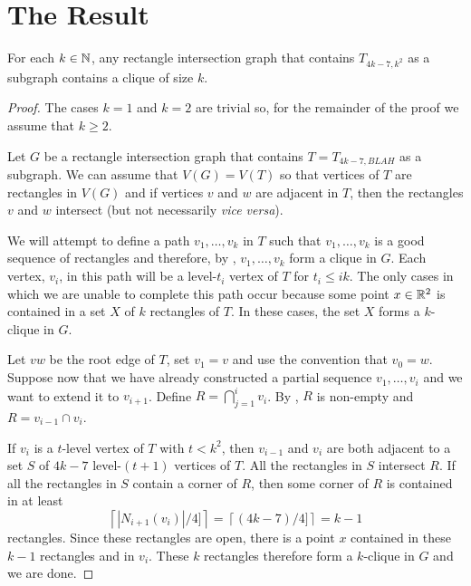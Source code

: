 \documentclass[lotsofwhite]{patmorin}
\begin{document}
\section{The Result}

\begin{thm}
  For each $k\in \mathbb{N}$, any rectangle intersection graph that contains
  $T_{4k-7,k^2}$ as a subgraph contains a clique of size $k$.
\end{thm}

\begin{proof}
  The cases $k=1$ and $k=2$ are trivial so, for the remainder of the proof
  we assume that $k\ge 2$.

  Let $G$ be a rectangle intersection graph that contains
  $T=T_{4k-7,BLAH}$ as a subgraph.  We can assume that $V(G)=V(T)$
  so that vertices of $T$ are rectangles in $V(G)$ and if vertices $v$
  and $w$ are adjacent in $T$, then the rectangles $v$ and $w$ intersect
  (but not necessarily \emph{vice versa}).  

  We will attempt to define a path $v_1,\ldots,v_k$ in $T$ such that
  $v_1,\ldots,v_k$ is a good sequence of rectangles and therefore,
  by , $v_1,\ldots,v_k$ form a clique in $G$.
  Each vertex, $v_i$, in this path will be a level-$t_i$ vertex of $T$
  for $t_i \le ik$.  The only cases in which we are unable to complete
  this path occur because some point $x\in\mathbb{R}^2$ is contained in a set
  $X$ of $k$ rectangles of $T$.  In these cases, the set $X$ forms a
  $k$-clique in $G$.

  Let $vw$ be the root edge of $T$, set $v_1=v$ and use the convention
  that $v_0=w$.  Suppose now that we have already constructed a partial
  sequence $v_1,\ldots,v_i$ and we want to extend it to $v_{i+1}$.
  Define $R=\bigcap_{j=1}^i v_i$.  By , $R$ is
  non-empty and $R=v_{i-1}\cap v_i$.

  If $v_i$ is a $t$-level vertex of $T$ with $t<k^2$, 
  then $v_{i-1}$ and $v_i$ are both adjacent to a set $S$ of $4k-7$
  level-$(t+1)$ vertices of $T$.  All the rectangles in $S$ intersect
  $R$.  
  If all the rectangles in $S$ contain a corner of $R$, then some corner
  of $R$ is contained in at least
  \[  \left\lceil |N_{i+1}(v_i)|/4]\right\rceil 
         = \left\lceil(4k-7)/4]\right\rceil = k-1
  \]
  rectangles.  Since these rectangles are open, there is a point $x$
  contained in these $k-1$ rectangles and in $v_{i}$.  These $k$
  rectangles therefore form a $k$-clique in $G$ and we are done.


\end{proof}
\end{document}
